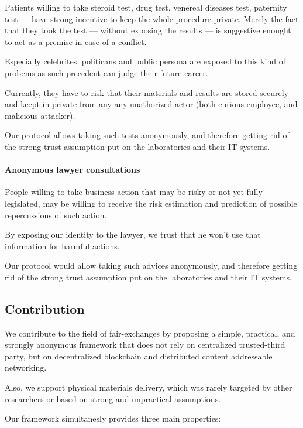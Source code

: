 \documentclass{ieeeaccess}
\begin{document}
Patients willing to take steroid test, drug test, venereal diseases
test, paternity test --- have strong incentive to keep the whole
procedure private. Merely the fact that they took the test --- without
exposing the results --- is suggestive enought to act as a premise in
case of a conflict.

Especially celebrites, politicans and public persona are exposed to this
kind of probems as such precedent can judge their future career.

Currently, they have to risk that their materials and results are stored
securely and keept in private from any any unathorized actor (both
curious employee, and malicious attacker).

Our protocol allows taking such tests anonymously, and therefore getting
rid of the strong trust assumption put on the laboratories and their IT
systems.


\paragraph{Anonymous lawyer consultations} \label{anonymous-lawyer-consultations}

People willing to take business action that may be risky or not yet fully legislated, may be willing to receive the risk estimation and prediction of possible repercussions of such action.

By exposing our identity to the lawyer, we trust that he won't use that
information for harmful actions.

Our protocol would allow taking such advices anonymously, and therefore
getting rid of the strong trust assumption put on the laboratories and
their IT systems.


\subsection{Contribution}
We contribute to the field of fair-exchanges by proposing a simple,
practical, and strongly anonymous framework that does not rely on
centralized trusted-third party, but on decentralized blockchain and
distributed content addressable networking.

Also, we support physical materials delivery, which was rarely targeted
by other researchers or based on strong and unpractical assumptions.

Our framework simultanesly provides three main properties:
\end{document}
